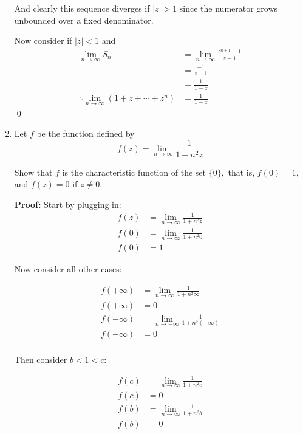 \begin{enumerate}
	      And clearly this sequence diverges if $|z| > 1$ since the numerator grows unbounded over a fixed denominator.

	      Now consider if $|z| < 1$ and
	      \begin{align*}
		      \lim_{n \to \infty} S_n                                & = \lim_{n \to \infty} \frac{z^{n +1} - 1}{z - 1} \\
		                                                             & =  \frac{- 1}{z - 1}                             \\
		                                                             & =  \frac{1}{1 - z}                               \\
		      \therefore \lim_{n \to \infty} (1 + z + \cdots + z^n ) & = \frac{1}{1 - z}
	      \end{align*}
	      \qed

	\item Let $f$ be the function defined by
	      \[ f(z) = \lim_{n \to \infty} \frac{1}{1 + n^2 z} \]

	      Show that $f$ is the characteristic function of the set $\{0\},$ that is, $f(0) = 1,$ and $f(z) = 0$ if $z \neq 0.$

	      \textbf{Proof:}
	      Start by plugging in:
	      \begin{align*}
		      f(z) & = \lim_{n \to \infty} \frac{1}{1 + n^2 z} \\
		      f(0) & = \lim_{n \to \infty} \frac{1}{1 + n^2 0} \\
		      f(0) & = 1
	      \end{align*}

	      Now consider all other cases:

	      \begin{align*}
		      f(+\infty) & = \lim_{n \to \infty} \frac{1}{1 + n^2 \infty}     \\
		      f(+\infty) & = 0                                                \\
		      f(-\infty) & = \lim_{n \to -\infty} \frac{1}{1 + n^2 (-\infty)} \\
		      f(-\infty) & = 0                                                \\
	      \end{align*}

	      Then consider $b < 1 < c$:

	      \begin{align*}
		      f(c) & = \lim_{n \to \infty} \frac{1}{1 + n^2 c} \\
		      f(c) & = 0                                       \\
		      f(b) & = \lim_{n \to \infty} \frac{1}{1 + n^2 b} \\
		      f(b) & = 0                                       \\
	      \end{align*}


\end{enumerate}

